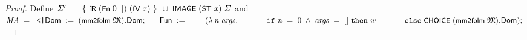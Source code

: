 \documentclass[letterpaper]{article}
\renewcommand{\HOLConst}[1]{{\textsf{\upshape\small #1}}}
\renewcommand{\HOLinline}[1]{\ensuremath{#1}}
\renewcommand{\HOLKeyword}[1]{\texttt{#1}}
\begin{document}
\begin{proof}
Define \HOLinline{\HOLFreeVar{\ensuremath{\Sigma}\sp{\prime}}\;\HOLSymConst{=}\;\HOLTokenLeftbrace{}\HOLConst{fR}\;(\HOLConst{Fn}\;\HOLNumLit{0}\;[])\;(\HOLConst{fV}\;\HOLFreeVar{x})\HOLTokenRightbrace{}\;\HOLSymConst{\HOLTokenUnion{}}\;\HOLConst{IMAGE}\;(\HOLConst{ST}\;\HOLFreeVar{x})\;\HOLFreeVar{\ensuremath{\Sigma}}} and \HOLinline{\HOLFreeVar{MA}\;\HOLSymConst{=}\\
\;\;\HOLTokenLeftrec{}\HOLFieldName{Dom}\;:=\;(\HOLConst{mm2folm}\;\HOLFreeVar{\ensuremath{\mathfrak{M}}}).\HOLFieldName{Dom};\\
\;\;\;\;\;\;\HOLFieldName{Fun}\;:=\\
\;\;\;\;\;\;\;\;(\HOLTokenLambda{}\HOLBoundVar{n}\;\HOLBoundVar{args}.\\
\;\;\;\;\;\;\;\;\;\;\;\;\;\HOLKeyword{if}\;\HOLBoundVar{n}\;\HOLSymConst{=}\;\HOLNumLit{0}\;\HOLSymConst{\HOLTokenConj{}}\;\HOLBoundVar{args}\;\HOLSymConst{=}\;[]\;\HOLKeyword{then}\;\HOLFreeVar{w}\\
\;\;\;\;\;\;\;\;\;\;\;\;\;\HOLKeyword{else}\;\HOLConst{CHOICE}\;(\HOLConst{mm2folm}\;\HOLFreeVar{\ensuremath{\mathfrak{M}}}).\HOLFieldName{Dom});\\
}
\end{proof}
\end{document}
